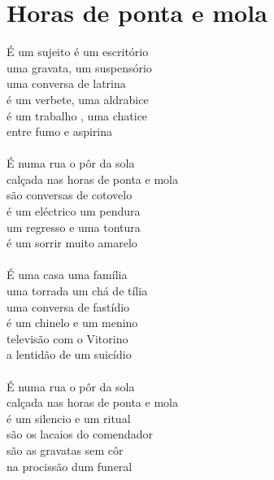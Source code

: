 \documentclass{article}
\begin{document}
\section{ Horas de ponta e mola}
É um sujeito é um escritório\\
uma gravata, um suspensório\\
uma conversa de latrina\\
é um verbete, uma aldrabice\\
é um trabalho , uma chatice\\
entre fumo e aspirina\\
\\
É numa rua o pôr da sola\\
calçada nas horas de ponta e mola\\
são conversas de cotovelo\\
é um eléctrico um pendura\\
um regresso e uma tontura\\
é um sorrir muito amarelo\\
\\
É uma casa uma família\\
uma torrada um chá de tília\\
uma conversa de fastídio\\
é um chinelo e um menino\\
televisão com o Vitorino\\
a lentidão de um suicídio\\
\\
É numa rua o pôr da sola\\
calçada nas horas de ponta e mola\\
é um silencio e um ritual\\
são os lacaios do comendador\\
são as gravatas sem côr\\
na procissão dum funeral\\
\\
\end{document}
